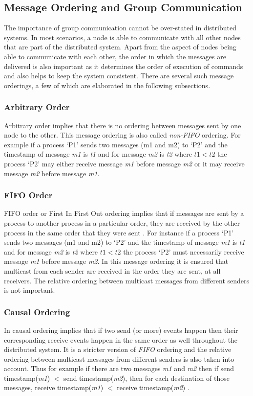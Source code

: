 \documentclass[a4paper, 12pt]{article}
\begin{document}
		\subsection{Message Ordering and Group Communication}
			The importance of group communication cannot be over-stated in distributed systems. In most scenarios, a node is able to communicate with all other nodes that are part of the distributed system. Apart from the aspect of nodes being able to communicate with each other, the order in which the messages are delivered is also important  as it determines the order of execution of commands and also helps to keep the system consistent. There are several such message orderings, a few of which are elaborated in the following subsections.
			
			\subsubsection{Arbitrary Order}
				Arbitrary order implies that there is no ordering between messages sent by one node to the other. This message ordering is also called \emph{non-FIFO} ordering. For example if a process `P1' sends two messages (m1 and m2) to `P2' and the timestamp of message \textit{m1} is \textit{t1} and for message \textit{m2} is \textit{t2} where $t1<t2$ the process `P2' may either receive message \textit{m1} before message \textit{m2} or it may receive message \textit{m2} before message \textit{m1}.
				
			\subsubsection{FIFO Order}
				FIFO order or First In First Out ordering implies that if messages are sent by a process to another process in a particular order, they are received by the other process in the same order that they were sent \cite{1}. For instance if a process `P1' sends two messages (m1 and m2) to `P2' and the timestamp of message \textit{m1} is \textit{t1} and for message \textit{m2} is \textit{t2} where $t1<t2$ the process `P2' must necessarily receive message \textit{m1} before message \textit{m2}. In this message ordering it is ensured that multicast from each sender are received in the order they are sent, at all receivers. The relative ordering between multicast messages from different senders is not important.
				
			\subsubsection{Causal Ordering}
				In causal ordering implies that if two send (or more) events happen then their corresponding receive events happen in the same order as well throughout the distributed system. It is a stricter version of \textit{FIFO} ordering and the relative ordering between multicast messages from different senders is also taken into account. Thus for example if there are two messages \textit{m1} and \textit{m2} then if send timestamp(\textit{m1}) $<$ send timestamp(\textit{m2}), then for each destination of those messages, receive timestamp(\textit{m1}) $<$ receive timestamp(\textit{m2}) \cite{2}.
							
\end{document}
